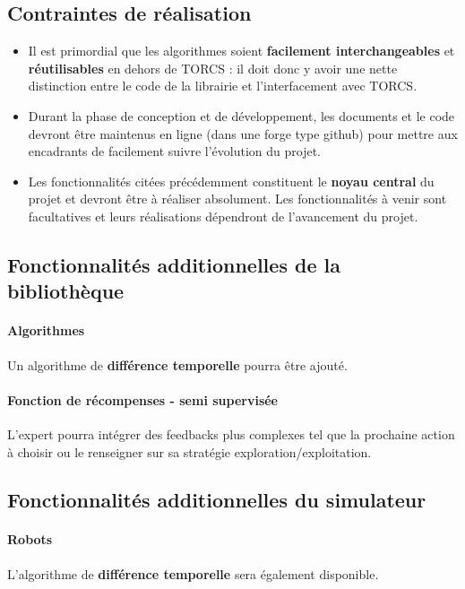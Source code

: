 \documentclass[a4paper,12pt]{article}
\begin{document}
	\subsection{Contraintes de réalisation}
	  \begin{itemize}
	   \item Il est primordial que les algorithmes soient \textbf{facilement interchangeables} et \textbf{réutilisables}
	   en dehors de TORCS : il doit donc y avoir une nette distinction entre le code de la librairie et
	   l'interfacement avec TORCS.
	   \item Durant la phase de conception et de développement, les documents et le code devront être maintenus 
	   en ligne (dans une forge type github) pour mettre aux encadrants de facilement suivre l'évolution du projet.
	   \item Les fonctionnalités citées précédemment constituent le \textbf{noyau central} du projet et devront être à
	   réaliser absolument. Les fonctionnalités à venir sont facultatives et leurs réalisations dépendront de 
	   l'avancement du projet.
	  \end{itemize}
		
	\subsection{Fonctionnalités additionnelles de la bibliothèque}
	  \paragraph{Algorithmes} Un algorithme de \textbf{différence temporelle} pourra être ajouté.
	  
	  \paragraph{Fonction de récompenses - semi supervisée} L'expert pourra intégrer des feedbacks plus complexes
	  tel que la prochaine action à choisir ou le renseigner sur sa stratégie exploration/exploitation.
	  
	\subsection{Fonctionnalités additionnelles du simulateur}
	  \paragraph{Robots} L'algorithme de \textbf{différence temporelle} sera également disponible.
\end{document}
